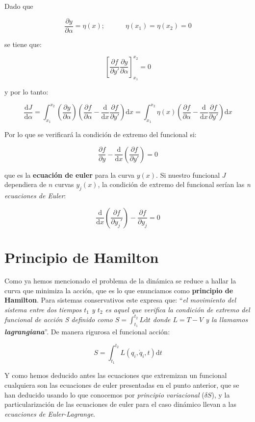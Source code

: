 \documentclass[12pt,a4paper]{book}
\newcommand{\parentesis}[1]{\left( #1  \right)}
\newcommand{\parciales}[2]{\frac{\partial #1}{\partial #2}}
\newcommand{\ccorchetes}[1]{\left[ #1  \right]}
\newcommand{\D}{\mathrm{d}}
\newcommand{\tquad}{\quad \quad \quad}
\newcommand{\intx}{\int_{x_1}^{x_2}}
\begin{document}
Dado que 

$$ \parciales{y}{\alpha} = \eta (x); \tquad \eta(x_1)=\eta (x_2) = 0$$

se tiene que:

$$ \ccorchetes{\parciales{f}{y'} \parciales{y}{\alpha}}_{x_1}^{x_2} = 0 $$

y por lo tanto:

\begin{equation}
\dfrac{\D J}{\D \alpha} = \intx  \parentesis{\parciales{y}{\alpha}} \parentesis{\parciales{f}{\alpha}-\dfrac{\D}{\D x}\parciales{f}{y'}} \D x = \intx  \eta (x) \parentesis{\parciales{f}{\alpha}-\dfrac{\D}{\D x}\parciales{f}{y'}} \D x
\end{equation}

Por lo que se verificará la condición de extremo del funcional si:

\begin{equation}
\parciales{f}{y} - \dfrac{\D}{\D x} \parentesis{\parciales{f}{y'}} = 0
\end{equation}

que es la \textbf{ecuación de euler} para la curva $y(x)$. Si nuestro funcional $J$ dependiera de $n$ curvas $y_j(x)$, la condición de extremo del funcional serían las \textit{n ecuaciones de Euler}:

\begin{equation}
\dfrac{\D}{\D x} \parentesis{\parciales{f}{y_j'}} - \parciales{f}{y_j} = 0
\label{Ec:1.1.012}
\end{equation}

\section{Principio de Hamilton}

Como ya hemos mencionado el problema de la dinámica se reduce a hallar la curva que minimiza la acción, que es lo que enunciamos como \textbf{principio de Hamilton}. Para sistemas conservativos este expresa que: ``\textit{el movimiento del sistema entre dos tiempos $t_1$ y $t_2$ es aquel que verifica la condición de extremo del funcional de acción S definido como $S = \int_{t_1}^{t_2} L \D t $ donde $L=T-V$ y la llamamos \textbf{lagrangiana}}''. De manera rigurosa el funcional acción:

\begin{equation}
S = \int_{t_1}^{t_2} L(q_i,\dot{q}_i,t) \D t
\end{equation}

Y como hemos deducido antes las ecuaciones que extremizan un funcional cualquiera son las ecuaciones de euler presentadas en el punto anterior, que se han deducido usando lo que conocemos por \textit{principio variacional} ($\delta S$), y la particularización de las ecuaciones de euler para el caso dinámico llevan a las \textit{ecuaciones de Euler-Lagrange}. \\
\end{document}
